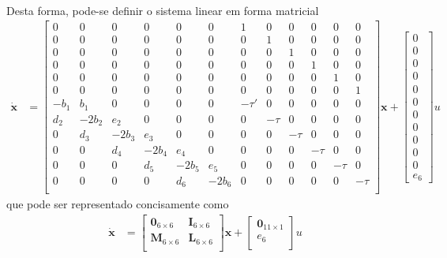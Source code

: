 \documentclass[a4paper,11pt]{scrartcl} %
\numberwithin{equation}{section} %
\numberwithin{figure}{section} %
\numberwithin{table}{section} %
\begin{document}
 \paragraph{} Desta forma, pode-se definir o sistema linear em forma matricial \begin{align}
 	\mathbf{\dot{x}} &= \left[\begin{array}{cccccccccccc}
 		0 & 0 & 0 & 0 & 0 & 0 & 1 & 0 & 0 & 0 & 0 & 0\\
 		0 & 0 & 0 & 0 & 0 & 0 & 0 & 1 & 0 & 0 & 0 & 0\\
 		0 & 0 & 0 & 0 & 0 & 0 & 0 & 0 & 1 & 0 & 0 & 0\\
 		0 & 0 & 0 & 0 & 0 & 0 & 0 & 0 & 0 & 1 & 0 & 0\\
 		0 & 0 & 0 & 0 & 0 & 0 & 0 & 0 & 0 & 0 & 1 & 0\\
 		0 & 0 & 0 & 0 & 0 & 0 & 0 & 0 & 0 & 0 & 0 & 1\\
 		-b_1 & b_1 & 0 & 0 & 0 & 0 & -\tau' & 0     & 0 & 0 & 0 & 0\\
 		d_2 & -2b_2  & e_2  & 0  & 0 & 0 &  0    & -\tau & 0 & 0 & 0 & 0\\
 		0 & d_3 & -2b_3  & e_3  & 0  & 0 & 0 &  0    & -\tau & 0 & 0 & 0\\
 		0 & 0 & d_4 & -2b_4  & e_4  & 0  & 0 & 0 &  0    & -\tau & 0 & 0\\
 		0 & 0 & 0 & d_5 & -2b_5  & e_5  & 0  & 0 & 0 &  0    & -\tau & 0\\
 		0 & 0 & 0 & 0 & d_6 & -2b_6  & 0  & 0 & 0 &  0    & 0   &-\tau\\
 	\end{array}\right]\mathbf{x} + \left[\begin{array}{c}
	0\\	0\\	0\\	0\\	0\\ 0\\ 0\\ 0\\ 0\\ 0\\ 0\\ e_6
\end{array}
\right]u
 \end{align} que pode ser representado concisamente como \begin{align}
 	\mathbf{\dot{x}} &= \left[\begin{array}{cc}
	\mathbf{0}_{6\times 6} & \mathbf{I}_{6\times 6}\\
	\mathbf{M}_{6\times 6} & \mathbf{L}_{6\times 6}\\
\end{array}\right] \mathbf{x} + \left[\begin{array}{c}
	\mathbf{0}_{11\times 1}\\ e_6\\
\end{array} \right]u
 \end{align} 
 
\end{document}
